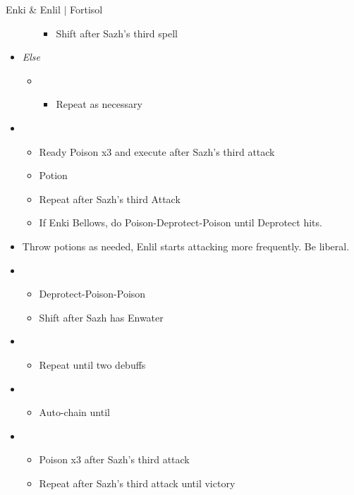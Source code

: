 \begin{battle}{Enki \& Enlil $|$ Fortisol}
\begin{multicols}{2}
\begin{itemize}
\begin{itemize}
\begin{itemize}
            \item Shift after Sazh's third spell
        \end{itemize}
    \end{itemize}
    \item \textit{Else}
    \begin{itemize}
        \item \fifth
        \begin{itemize}
            \item Repeat as necessary
        \end{itemize}
    \end{itemize}
    \item \second
    \begin{itemize}
        \item Ready Poison x3 and execute after Sazh's third attack
        \item Potion
        \item Repeat after Sazh's third Attack
        \item If Enki Bellows, do Poison-Deprotect-Poison until Deprotect hits.
    \end{itemize}
    \item Throw potions as needed, Enlil starts attacking more frequently. Be liberal.
    \item \third
    \begin{itemize}
        \item Deprotect-Poison-Poison
        \item Shift after Sazh has Enwater
    \end{itemize}
    \item \fifth
    \begin{itemize}
        \item Repeat until two debuffs
    \end{itemize}
    \item \fourth
    \begin{itemize}
        \item Auto-chain until \stagger
    \end{itemize}
    \item \second
    \begin{itemize}
        \item Poison x3 after Sazh's third attack
        \item Repeat after Sazh's third attack until victory
    \end{itemize}
\end{itemize}
\vfill\null
\end{multicols}
\end{battle}

